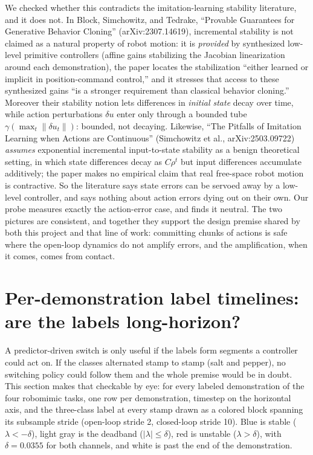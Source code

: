 \documentclass[11pt]{article}
\begin{document}
We checked whether this contradicts the imitation-learning stability literature,
and it does not. In Block, Simchowitz, and Tedrake, ``Provable Guarantees for
Generative Behavior Cloning'' (arXiv:2307.14619), incremental stability is not
claimed as a natural property of robot motion: it is \emph{provided} by
synthesized low-level primitive controllers (affine gains stabilizing the
Jacobian linearization around each demonstration), the paper locates the
stabilization ``either learned or implicit in position-command control,'' and it
stresses that access to these synthesized gains ``is a stronger requirement than
classical behavior cloning.'' Moreover their stability notion lets differences in
\emph{initial state} decay over time, while action perturbations
$\delta u$ enter only through a bounded tube $\gamma(\max_t \|\delta u_t\|)$:
bounded, not decaying. Likewise, ``The Pitfalls of Imitation Learning when
Actions are Continuous'' (Simchowitz et al., arXiv:2503.09722) \emph{assumes}
exponential incremental input-to-state stability as a benign theoretical setting,
in which state differences decay as $C\rho^t$ but input differences accumulate
additively; the paper makes no empirical claim that real free-space robot motion
is contractive. So the literature says state errors can be servoed away by a
low-level controller, and says nothing about action errors dying out on their
own. Our probe measures exactly the action-error case, and finds it neutral. The
two pictures are consistent, and together they support the design premise shared
by both this project and that line of work: committing chunks of actions is safe
where the open-loop dynamics do not amplify errors, and the amplification, when
it comes, comes from contact.

\section{Per-demonstration label timelines: are the labels long-horizon?}
\label{sec:timelines}

A predictor-driven switch is only useful if the labels form segments a
controller could act on. If the classes alternated stamp to stamp (salt and
pepper), no switching policy could follow them and the whole premise would be
in doubt. This section makes that checkable by eye: for every labeled
demonstration of the four robomimic tasks, one row per demonstration, timestep
on the horizontal axis, and the three-class label at every stamp drawn as a
colored block spanning its subsample stride (open-loop stride 2, closed-loop
stride 10). Blue is stable ($\lambda < -\delta$), light gray is the deadband
($|\lambda| \leq \delta$), red is unstable ($\lambda > \delta$), with
$\delta = 0.0355$ for both channels, and white is past the end of the
demonstration.
\end{document}
